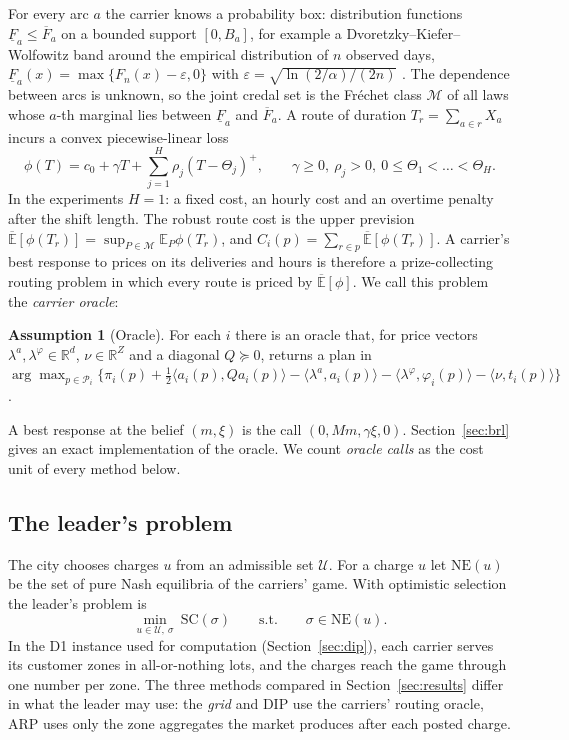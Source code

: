 \documentclass[preprint,12pt]{elsarticle}
\theoremstyle{definition}
\newtheorem{assumption}{Assumption}
\theoremstyle{remark}
\newcommand{\R}{\mathbb{R}}
\newcommand{\E}{\mathbb{E}}
\newcommand{\cP}{\mathcal{P}}
\newcommand{\cM}{\mathcal{M}}
\newcommand{\Eu}{\overline{\mathbb{E}}}
\newcommand{\Fl}{\underline{F}}
\newcommand{\Fu}{\overline{F}}
\newcommand{\pos}[1]{\left(#1\right)^{+}}
\newcommand{\ip}[2]{\langle #1,#2\rangle}
\begin{document}
For every arc $a$ the carrier knows a probability box: distribution functions $\Fl_a\le\Fu_a$ on a bounded support $[0,B_a]$, for example a Dvoretzky--Kiefer--Wolfowitz band around the empirical distribution of $n$ observed days, $\Fl_a(x)=\max\{F_n(x)-\varepsilon,0\}$ with $\varepsilon=\sqrt{\ln(2/\alpha)/(2n)}$ \citep{DKW1956,Massart1990}. The dependence between arcs is unknown, so the joint credal set is the Fr\'echet class $\cM$ of all laws whose $a$-th marginal lies between $\Fl_a$ and $\Fu_a$. A route of duration $T_r=\sum_{a\in r}X_a$ incurs a convex piecewise-linear loss
\begin{equation}\label{eq:loss}
\phi(T)=c_0+\gamma T+\textstyle\sum_{j=1}^{H}\rho_j\pos{T-\Theta_j},\qquad \gamma\ge0,\ \rho_j>0,\ 0\le\Theta_1<\dots<\Theta_H.
\end{equation}
In the experiments $H=1$: a fixed cost, an hourly cost and an overtime penalty after the shift length. The robust route cost is the upper prevision $\Eu[\phi(T_r)]=\sup_{P\in\cM}\E_P\phi(T_r)$, and $C_i(p)=\sum_{r\in p}\Eu[\phi(T_r)]$. A carrier's best response to prices on its deliveries and hours is therefore a prize-collecting routing problem in which every route is priced by $\Eu[\phi]$. We call this problem the \emph{carrier oracle}:
\begin{assumption}[Oracle]\label{ass:oracle}
For each $i$ there is an oracle that, for price vectors $\lambda^a,\lambda^\varphi\in\R^d$, $\nu\in\R^Z$ and a diagonal $Q\succeq0$, returns a plan in $\arg\max_{p\in\cP_i}\{\pi_i(p)+\tfrac12\ip{a_i(p)}{Qa_i(p)}-\ip{\lambda^a}{a_i(p)}-\ip{\lambda^\varphi}{\varphi_i(p)}-\ip{\nu}{t_i(p)}\}$.
\end{assumption}
A best response at the belief $(m,\xi)$ is the call $(0,Mm,\gamma\xi,0)$. Section~\ref{sec:brl} gives an exact implementation of the oracle. We count \emph{oracle calls} as the cost unit of every method below.

\subsection{The leader's problem}

The city chooses charges $u$ from an admissible set $\mathcal U$. For a charge $u$ let $\mathrm{NE}(u)$ be the set of pure Nash equilibria of the carriers' game. With optimistic selection the leader's problem is
\begin{equation}\label{eq:bilevel}
\min_{u\in\mathcal U,\ \sigma}\ \mathrm{SC}(\sigma)\qquad\text{s.t.}\qquad\sigma\in\mathrm{NE}(u).
\end{equation}
In the D1 instance used for computation (Section~\ref{sec:dip}), each carrier serves its customer zones in all-or-nothing lots, and the charges reach the game through one number per zone. The three methods compared in Section~\ref{sec:results} differ in what the leader may use: the \emph{grid} and DIP use the carriers' routing oracle, ARP uses only the zone aggregates the market produces after each posted charge.
\end{document}
